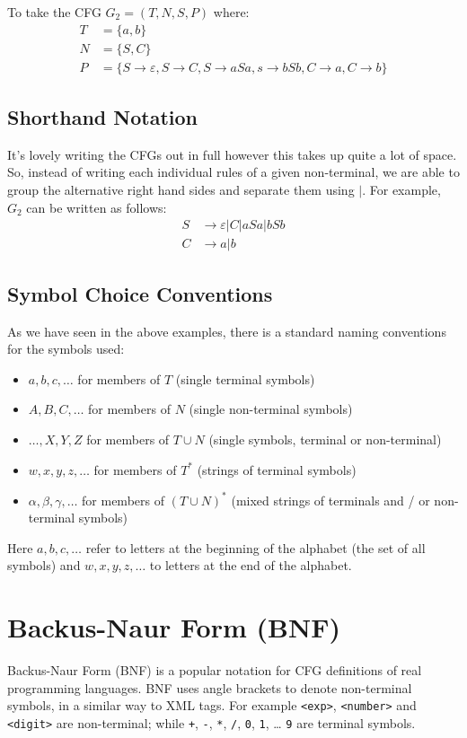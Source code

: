 To take the CFG $G_2 = (T, N, S, P)$ where:
\begin{align*}
    T &= \{a,b\}\\
    N &= \{S,C\}\\
    P &= \{S \rightarrow \varepsilon, S \rightarrow C, S \rightarrow aSa, s \rightarrow bSb, C \rightarrow a, C \rightarrow b \}
\end{align*}

\subsection{Shorthand Notation}
It's lovely writing the CFGs out in full however this takes up quite a lot of space. So, instead of writing each individual rules of a given non-terminal, we are able to group the alternative right hand sides and separate them using $|$. For example, $G_2$ can be written as follows:
\begin{align*}
    S & \rightarrow \varepsilon | C | aSa | bSb\\
    C & \rightarrow a | b
\end{align*}

\subsection{Symbol Choice Conventions}
As we have seen in the above examples, there is a standard naming conventions for the symbols used:
\begin{itemize}
    \item $a, b, c, \ldots$ for members of $T$ (single terminal symbols)
    \item $A, B, C, \ldots$ for members of $N$ (single non-terminal symbols)
    \item $\ldots, X, Y, Z$ for members of $T \cup N$ (single symbols, terminal or non-terminal)
    \item $w, x, y, z, \ldots$ for members of $T^*$ (strings of terminal symbols)
    \item $\alpha, \beta, \gamma, \ldots$ for members of $(T\cup N)^*$ (mixed strings of terminals and / or non-terminal symbols)
\end{itemize}
Here $a, b, c, \ldots$ refer to letters at the beginning of the alphabet (the set of all symbols) and $w, x, y, z, \ldots$ to letters at the end of the alphabet.

\section{Backus-Naur Form (BNF)}
Backus-Naur Form (BNF) is a popular notation for CFG definitions of real programming languages. BNF uses angle brackets to denote non-terminal symbols, in a similar way to XML tags. For example \verb|<exp>|, \verb|<number>| and \verb|<digit>| are non-terminal; while \verb|+|, \verb|-|, \verb|*|, \verb|/|, \verb|0|, \verb|1|, \ldots{} \verb|9| are terminal symbols. 

